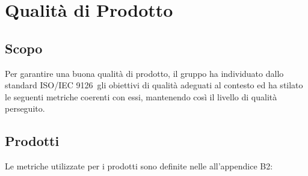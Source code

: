 \section{Qualità di Prodotto}
\subsection{Scopo}
Per garantire una buona qualità di prodotto, il gruppo ha individuato dallo standard ISO/IEC 9126\pedice~gli obiettivi di qualità adeguati al contesto ed ha stilato le seguenti metriche coerenti con essi, mantenendo così il livello di qualità perseguito.

\subsection{Prodotti}
Le metriche utilizzate per i prodotti sono definite nelle \NdP all'appendice B2:
\newpage
